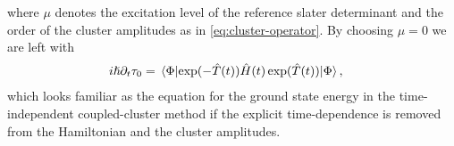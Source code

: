         where $\mu$ denotes the excitation level of the reference slater
        determinant and the order of the cluster amplitudes as in
        \autoref{eq:cluster-operator}.
        By choosing $\mu = 0$ we are left with
        \begin{align}
            i\hslash \partial_t\clustamp_{0}
            &=
            \mel*{\slat}{
                \exponential(-\clust(t))
                \hamil(t)
                \exponential(\clust(t))
            }{\slat},
        \end{align}
        which looks familiar as the equation for the ground state
        energy in the time-independent coupled-cluster method if the
        explicit time-dependence is removed from the Hamiltonian and the
        cluster amplitudes.

\clearemptydoublepage
